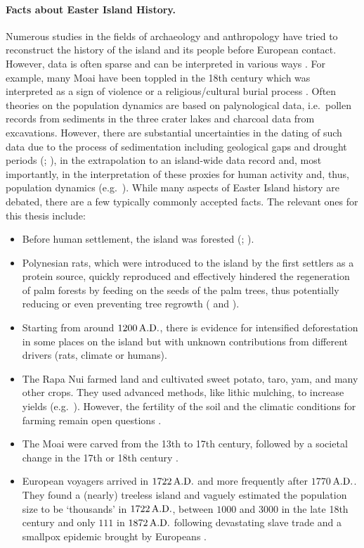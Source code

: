 \paragraph{Facts about Easter Island History.}
Numerous studies in the fields of archaeology and anthropology have tried to reconstruct the history of the island and its people before European contact.
However, data is often sparse and can be interpreted in various ways \citep{Merico2017}.
For example, many Moai have been toppled in the 18th century which was interpreted as a sign of violence \citep{Bahn2017} or a religious/cultural burial process \citep{Cauwe2011}.
Often theories on the population dynamics are based on palynological data, i.e.\ pollen records from sediments in the three crater lakes and charcoal data from excavations.
However, there are substantial uncertainties in the dating of such data due to the process of sedimentation including geological gaps and drought periods (; ), in the extrapolation to an island-wide data record \citep{Rull2020} and, most importantly, in the interpretation of these proxies for human activity and, thus, population dynamics (e.g.\ ).
While many aspects of Easter Island history are debated, there are a few typically commonly accepted facts.
The relevant ones for this thesis include:
\begin{itemize}
	\item Before human settlement, the island was forested (; ).
	\item Polynesian rats, which were introduced to the island by the first settlers as a protein source, quickly reproduced and effectively hindered the regeneration of palm forests by feeding on the seeds of the palm trees, thus potentially reducing or even preventing tree regrowth ( and ).
	\item Starting from around $1200\,{\rm A.D.}$, there is evidence for intensified deforestation in some places on the island \citep{Rull2020} but with unknown contributions from different drivers (rats, climate or humans).
	\item The Rapa Nui farmed land and cultivated sweet potato, taro, yam, and many other crops. They used advanced methods, like lithic mulching, to increase yields (e.g.\ ). However, the fertility of the soil and the climatic conditions for farming remain open questions \citep{Bahn2017}.
	\item The Moai were carved from the 13th to 17th century, followed by a societal change in the 17th or 18th century \citep{Cauwe2011}.
	\item European voyagers arrived in $1722\, {\rm A.D.}$ and more frequently after $1770\,$${\rm A.D.}$. They found a (nearly) treeless island and vaguely estimated the population size to be `thousands' in $1722\, {\rm A.D.}$, between $1000$ and $3000$ in the late 18th century and only $111$ in $1872\, {\rm A.D.}$ following devastating slave trade and a smallpox epidemic brought by Europeans \citep{Bahn2017}.
\end{itemize}

